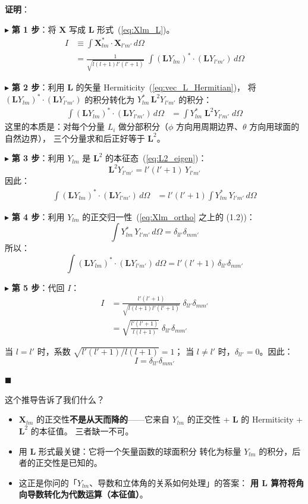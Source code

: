 \textbf{证明}：

$\blacktriangleright$ \textbf{第 1 步}：将 $\mathbf{X}$ 写成 $\mathbf{L}$ 形式~(\ref{eq:Xlm_L})。
\begin{align*}
I &\equiv \int \mathbf{X}_{lm}^* \cdot \mathbf{X}_{l'm'}\,d\Omega \\
  &= \frac{1}{\sqrt{l(l+1)l'(l'+1)}}\;
     \int (\mathbf{L}Y_{lm})^* \cdot (\mathbf{L}Y_{l'm'})\,d\Omega
\end{align*}

$\blacktriangleright$ \textbf{第 2 步}：利用 $\mathbf{L}$ 的矢量 Hermiticity~(\ref{eq:vec_L_Hermitian})，
将 $(\mathbf{L}Y_{lm})^*\cdot(\mathbf{L}Y_{l'm'})$ 的积分转化为 $Y_{lm}^*\,\mathbf{L}^2 Y_{l'm'}$ 的积分：
\begin{align*}
\int (\mathbf{L}Y_{lm})^* \cdot (\mathbf{L}Y_{l'm'})\,d\Omega
&= \int Y_{lm}^*\; \mathbf{L}^2 Y_{l'm'}\; d\Omega
\end{align*}
这里的本质是：对每个分量 $L_i$ 做分部积分（$\phi$ 方向用周期边界、$\theta$ 方向用球面的自然边界），
三个分量求和后正好等于 $\mathbf{L}^2$。

$\blacktriangleright$ \textbf{第 3 步}：利用 $Y_{lm}$ 是 $\mathbf{L}^2$ 的本征态~(\ref{eq:L2_eigen})：
$$
\mathbf{L}^2 Y_{l'm'} = l'(l'+1)\,Y_{l'm'}
$$
因此：
\begin{align*}
\int (\mathbf{L}Y_{lm})^* \cdot (\mathbf{L}Y_{l'm'})\,d\Omega
&= l'(l'+1) \int Y_{lm}^*\,Y_{l'm'}\,d\Omega
\end{align*}

$\blacktriangleright$ \textbf{第 4 步}：利用 $Y_{lm}$ 的正交归一性~(\ref{eq:Xlm_ortho} 之上的 (1.2))：
$$
\int Y_{lm}^*\,Y_{l'm'}\,d\Omega = \delta_{ll'}\delta_{mm'}
$$
所以：
$$
\int (\mathbf{L}Y_{lm})^* \cdot (\mathbf{L}Y_{l'm'})\,d\Omega
= l'(l'+1)\,\delta_{ll'}\delta_{mm'}
$$

$\blacktriangleright$ \textbf{第 5 步}：代回 $I$：
\begin{align*}
I &= \frac{l'(l'+1)}{\sqrt{l(l+1)l'(l'+1)}}\;\delta_{ll'}\delta_{mm'} \\
  &= \sqrt{\frac{l'(l'+1)}{l(l+1)}}\;\delta_{ll'}\delta_{mm'}
\end{align*}

当 $l = l'$ 时，系数 $\sqrt{l'(l'+1)/l(l+1)} = 1$；
当 $l \neq l'$ 时，$\delta_{ll'} = 0$。因此：
$$
I = \delta_{ll'}\delta_{mm'}
$$

$\blacksquare$

\begin{stepbox}{这个推导告诉了我们什么？}
\begin{itemize}
  \item $\mathbf{X}_{lm}$ 的正交性\textbf{不是从天而降的}——它来自
    $Y_{lm}$ 的正交性 + $\mathbf{L}$ 的 Hermiticity + $\mathbf{L}^2$ 的本征值。
    三者缺一不可。
  \item 用 $\mathbf{L}$ 形式最关键：它将一个矢量函数的球面积分
    转化为标量 $Y_{lm}$ 的积分，后者的正交性是已知的。
  \item 这正是你问的「$Y_{lm}$、导数和立体角的关系如何处理」的答案：
    \textbf{用 $\mathbf{L}$ 算符将角向导数转化为代数运算（本征值）}。
\end{itemize}
\end{stepbox}

